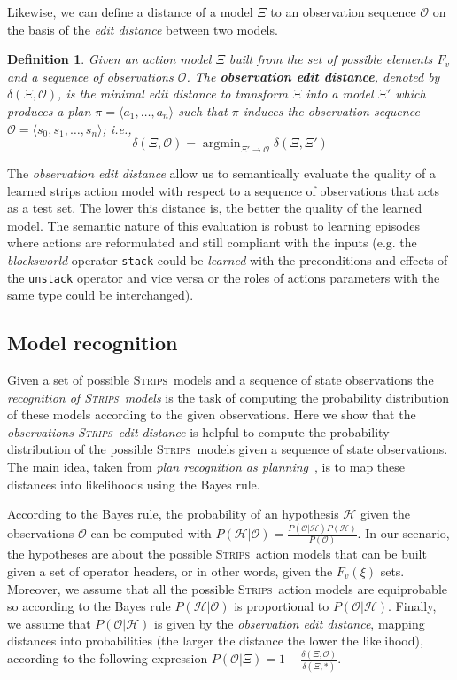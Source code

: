 \documentclass{article}
\newcommand{\tup}[1]{{\langle #1 \rangle}}
\newcommand{\argmin}{\mathop{\mbox{argmin}}}
\newcommand{\strips}{\textsc{Strips}}     %
\newtheorem{definition}[theorem]{Definition}
\begin{document}
Likewise, we can define a distance of a model $\Xi$ to an observation sequence $\mathcal{O}$ on the basis of the \emph{edit distance} between two models.

\begin{definition}
Given an action model $\Xi$ built from the set of possible elements $F_v$ and a sequence of observations $\mathcal{O}$. The {\bf observation edit distance}, denoted by  $\delta(\Xi,\mathcal{O})$, is the minimal edit distance to transform $\Xi$ into a model $\Xi'$ which produces a plan $\pi=\tup{a_1, \ldots, a_n}$ such that $\pi$ induces the observation sequence $\mathcal{O}=\tup{s_0, s_1, \ldots, s_n}$; i.e., \[\delta(\Xi,\mathcal{O})=\argmin_{\Xi' \rightarrow \mathcal{O}} \delta(\Xi,\Xi')\]
\end{definition}



The {\em observation edit distance} allow us to semantically evaluate the quality of a learned strips action model with respect to a sequence of observations that acts as a test set. The lower this distance is, the better the quality of the learned model. The semantic nature of this evaluation is robust to learning episodes where actions are reformulated and still compliant with the inputs (e.g. the {\em blocksworld} operator {\small\tt stack} could be {\em learned} with the preconditions and effects of the {\small\tt unstack} operator and vice versa or the roles of actions parameters with the same type could be interchanged).


\subsection{Model recognition}
Given a set of possible \strips\ models and a sequence of state observations the {\em recognition of \strips\ models} is the task of computing the probability distribution of these models according to the given observations. Here we show that the {\em observations  \strips\ edit distance} is helpful to compute the probability distribution of the possible \strips\ models given a sequence of state observations. The main idea, taken from {\em plan recognition as planning}~\cite{ramirez2009plan}, is to map these distances into likelihoods using the Bayes rule.

According to the Bayes rule, the probability of an hypothesis $\mathcal{H}$ given the observations $\mathcal{O}$ can be computed with $P(\mathcal{H}|\mathcal{O})=\frac{P(\mathcal{O}|\mathcal{H})P(\mathcal{H})}{P(\mathcal{O})}$. In our scenario, the hypotheses are about the possible \strips\ action models that can be built given a set of operator headers, or in other words, given the $F_v(\xi)$ sets. Moreover, we assume that all the possible \strips\ action models are equiprobable so according to the Bayes rule $P(\mathcal{H}|\mathcal{O})$ is proportional to $P(\mathcal{O}|\mathcal{H})$. Finally, we assume that $P(\mathcal{O}|\mathcal{H})$ is given by the {\em observation edit distance}, mapping distances into probabilities (the larger the distance the lower the likelihood), according to the following expression $P(\mathcal{O}|\Xi)=1-\frac{\delta(\Xi,\mathcal{O})}{\delta(\Xi,*)}$.
\end{document}
